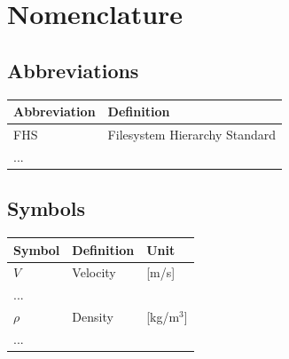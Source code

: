 \chapter*{Nomenclature}


\section*{Abbreviations}

\begin{longtable}{p{2.5cm}p{8cm}}
    \toprule
    Abbreviation & Definition \\
    \midrule\endhead %
    FHS & Filesystem Hierarchy Standard \\
    ... \\
    \bottomrule
\end{longtable}

\section*{Symbols}

\begin{longtable}{p{2.5cm}p{8cm}p{2.5cm}}
    \toprule
    Symbol & Definition & Unit \\
    \midrule\endhead %
    $V$ & Velocity & [m/s] \\
    ... \\
    \midrule %
    $\rho$ & Density & [kg/m$^3$] \\
    ... \\
    \bottomrule
\end{longtable}
